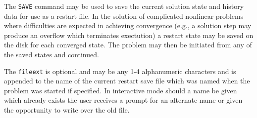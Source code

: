 \headb

The {\tt SAVE} command may be used to save the
current solution state and history data for use as a restart
file.  In the solution of complicated nonlinear problems
where difficulties are expected in achieving convergence
(e.g., a solution step may produce an overflow which terminates
exectution) a restart state may be saved on the disk
for each converged state.  The problem may then be initiated
from any of the saved states and continued.

The {\tt fileext} is optional and may be any 1-4
alphanumeric characters and is appended to the name of the
current restart save file which was named when the problem
was started if specified.  In interactive mode should a name
be given which already exists the user receives a prompt for
an alternate name or given the opportunity to write over the
old file.
\vfill\eject

